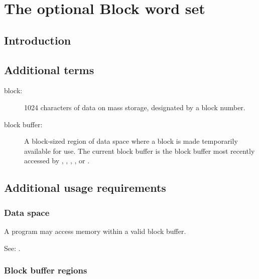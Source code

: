
\chapter{The optional Block word set} %

\section{Introduction} %

\section{Additional terms} %

\begin{description}
\item[block:]
	1024 characters of data on mass storage,
	designated by a block number.

\item[block buffer:]
	A block-sized region of data space where a block is made
	temporarily available for use. The current block buffer
	is the block buffer most recently accessed by
	, , , , or
	.
\end{description}

\section{Additional usage requirements} %

\subsection{Data space} %

A program may access memory within a valid block buffer.

See: .

\subsection{Block buffer regions} %
\label{block:buffers}

